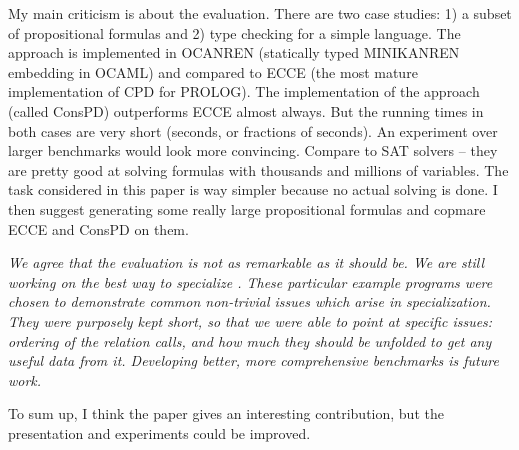 My main criticism is about the evaluation. There are two case studies: 1) a subset of propositional formulas and 2) type checking for a simple language. The approach is implemented in OCANREN (statically typed MINIKANREN embedding in OCAML) and compared to ECCE (the most mature implementation of CPD for PROLOG). The implementation of the approach (called ConsPD) outperforms ECCE almost always. But the running times in both cases are very short (seconds, or fractions of seconds). An experiment over larger benchmarks would look more convincing. Compare to SAT solvers -- they are pretty good at solving formulas with thousands and millions of variables. The task considered in this paper is way simpler because no actual solving is done. I then suggest generating some really large propositional formulas and copmare ECCE and ConsPD on them.

\emph{We agree that the evaluation is not as remarkable as it should be. We are still working on the best way to specialize \mk. These particular example programs were chosen to demonstrate common non-trivial issues which arise in \mk specialization. They were purposely kept short, so that we were able to point at specific issues: ordering of the relation calls, and how much they should be unfolded to get any useful data from it. Developing better, more comprehensive benchmarks is future work.}

To sum up, I think the paper gives an interesting contribution, but the presentation and experiments could be improved.

